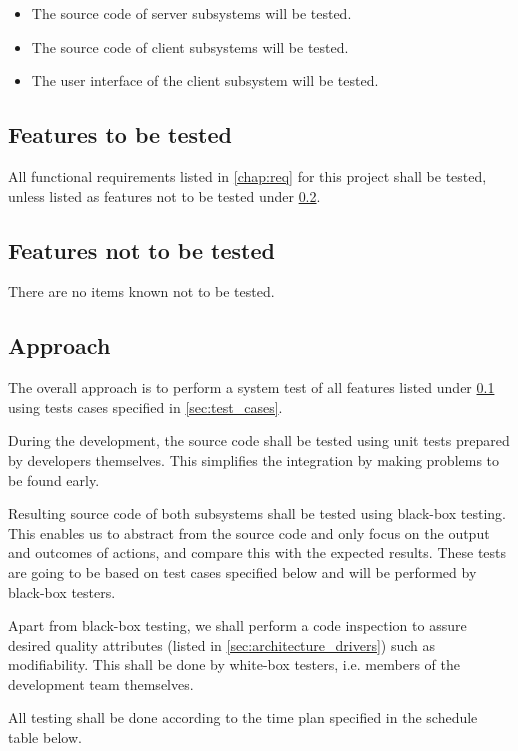 \documentclass[11pt]{book}
\begin{document}
\begin{itemize}
	\item The source code of server subsystems will be tested.
	\item The source code of client subsystems will be tested.
	\item The user interface of the client subsystem will be tested.
\end{itemize}

\subsection{Features to be tested} \label{sec:test_plan_features_tested}
All functional requirements listed in \ref{chap:req} for this project shall be tested, unless listed as features not to be tested under \ref{sec:test_plan_features_not_tested}.

\subsection{Features not to be tested} \label{sec:test_plan_features_not_tested}
There are no items known not to be tested.

\subsection{Approach}
The overall approach is to perform a system test of all features listed under \ref{sec:test_plan_features_tested} using tests cases specified in \ref{sec:test_cases}.

During the development, the source code shall be tested using unit tests prepared by developers themselves. This simplifies the integration by making problems to be found early.

Resulting source code of both subsystems shall be tested using black-box testing. This enables us to abstract from the source code and only focus on the output and outcomes of actions, and compare this with the expected results. These tests are going to be based on test cases specified below and will be performed by black-box testers.

Apart from black-box testing, we shall perform a code inspection to assure desired quality attributes (listed in \ref{sec:architecture_drivers}) such as modifiability. This shall be done by white-box testers, i.e. members of the development team themselves.

All testing shall be done according to the time plan specified in the schedule table below.
\end{document}
